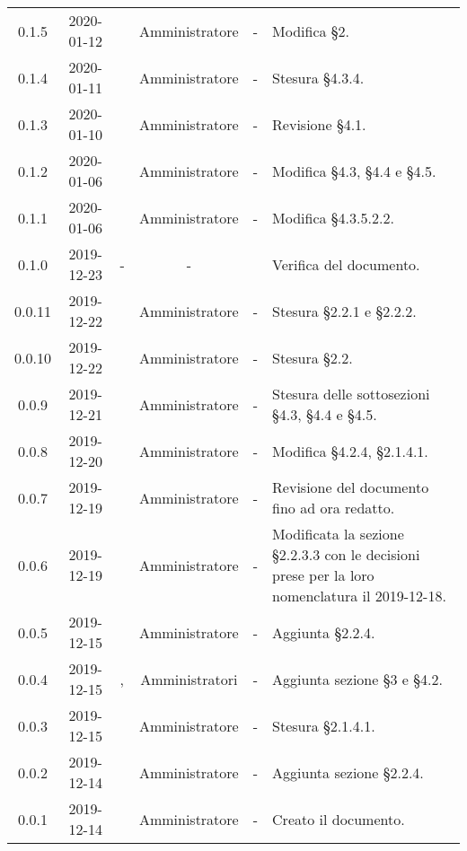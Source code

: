 {\begin{longtable}{ c c  C{2.3cm} c C{3cm} C{3.2cm}}
0.1.5 & 2020-01-12 & \AT{} & Amministratore & - & Modifica §2. \\

0.1.4 & 2020-01-11 & \MC{} & Amministratore & - & Stesura §4.3.4. \\

0.1.3 & 2020-01-10 & \MC{} & Amministratore & - & Revisione §4.1. \\

0.1.2 & 2020-01-06 & \AT{} & Amministratore & - & Modifica §4.3, §4.4 e §4.5. \\

0.1.1 & 2020-01-06 & \AT{} & Amministratore & - & Modifica §4.3.5.2.2. \\

0.1.0 & 2019-12-23 & - & - & \CE{} & Verifica del documento. \\

0.0.11 & 2019-12-22 & \PF{} & Amministratore & - & Stesura §2.2.1 e §2.2.2. \\

0.0.10 & 2019-12-22 & \PF{} & Amministratore & - & Stesura §2.2. \\

0.0.9 & 2019-12-21 & \PF{} & Amministratore & - & Stesura delle sottosezioni §4.3, §4.4 e §4.5. \\

0.0.8 & 2019-12-20 & \MC{} & Amministratore & - & Modifica §4.2.4, §2.1.4.1. \\

0.0.7 & 2019-12-19 & \SE{} & Amministratore & - & Revisione del documento fino ad ora redatto. \\

0.0.6 & 2019-12-19 & \CE{} & Amministratore & - & Modificata la sezione §2.2.3.3 con le decisioni prese per la loro nomenclatura il 2019-12-18. \\

0.0.5 & 2019-12-15 & \SE{} & Amministratore & - & Aggiunta §2.2.4. \\

0.0.4 & 2019-12-15 & \BR{}, \PF{} & Amministratori & - & Aggiunta sezione §3 e §4.2. \\

0.0.3 & 2019-12-15 & \MC{} & Amministratore & - & Stesura §2.1.4.1. \\

0.0.2 & 2019-12-14 & \CE{} & Amministratore & - & Aggiunta sezione §2.2.4. \\

0.0.1 & 2019-12-14 & \CE{} & Amministratore & - & Creato il documento. \\
		
\end{longtable}
}